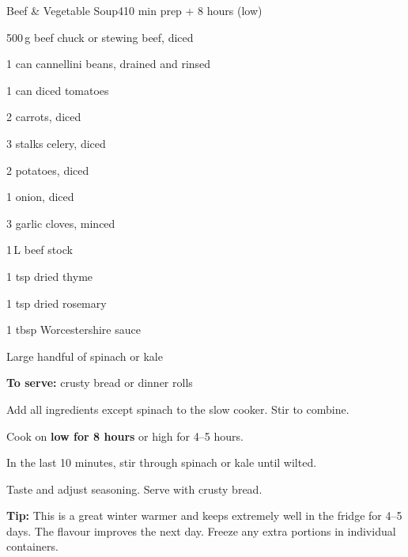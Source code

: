 \begin{recipebox}{Beef \& Vegetable Soup}{4}{10 min prep + 8 hours (low)}
\begin{ingredients}
  \item 500\,g beef chuck or stewing beef, diced
  \item 1 can cannellini beans, drained and rinsed
  \item 1 can diced tomatoes
  \item 2 carrots, diced
  \item 3 stalks celery, diced
  \item 2 potatoes, diced
  \item 1 onion, diced
  \item 3 garlic cloves, minced
  \item 1\,L beef stock
  \item 1 tsp dried thyme
  \item 1 tsp dried rosemary
  \item 1 tbsp Worcestershire sauce
  \item Large handful of spinach or kale
  \item \textbf{To serve:} crusty bread or dinner rolls
\end{ingredients}

\begin{method}
  \item Add all ingredients except spinach to the slow cooker. Stir to combine.
  \item Cook on \textbf{low for 8 hours} or high for 4--5 hours.
  \item In the last 10 minutes, stir through spinach or kale until wilted.
  \item Taste and adjust seasoning. Serve with crusty bread.
\end{method}

\begin{notelist}
  \item \textbf{Tip:} This is a great winter warmer and keeps extremely well in the fridge for 4--5 days. The flavour improves the next day. Freeze any extra portions in individual containers.
\end{notelist}
\end{recipebox}
